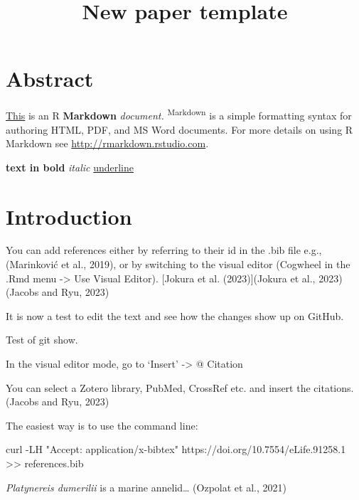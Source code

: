 \documentclass[
  11pt,
]{article}
\title{New paper template}
\subtitle{\raggedright

Author 1\textsuperscript{1,2,*} , Author 2\textsuperscript{1,2}, Author
3\textsuperscript{3}, Author 4E\textsuperscript{4}
\newline\textsuperscript{1}Heidelberg University, Centre for Organismal
Studies (COS), 69120 Heidelberg, Germany
\newline\textsuperscript{2}Affiliation 2
\newline\textsuperscript{3}Affiliation 3
\newline\textsuperscript{4}Affiliation 4\newline
\textsuperscript{*}Correspondence: xy@cos.uni-heidelberg.de}
\author{}
\date{}
\newenvironment{Shaded}{\begin{snugshade}}{\end{snugshade}}
\newcommand{\AttributeTok}[1]{\textcolor[rgb]{0.40,0.45,0.13}{#1}}
\newcommand{\ExtensionTok}[1]{\textcolor[rgb]{0.00,0.23,0.31}{#1}}
\newcommand{\NormalTok}[1]{\textcolor[rgb]{0.00,0.23,0.31}{#1}}
\newcommand{\OperatorTok}[1]{\textcolor[rgb]{0.37,0.37,0.37}{#1}}
\newcommand{\StringTok}[1]{\textcolor[rgb]{0.13,0.47,0.30}{#1}}
\renewcommand*\contentsname{Table of contents}
\newcommand\contentsname{Table of contents}
\begin{document}
\maketitle

\linenumbers

\renewcommand*\contentsname{Table of contents}
{
\hypersetup{linkcolor=}
\setcounter{tocdepth}{3}
\tableofcontents
}
\section{Abstract}\label{abstract}

\ul{This} is an R \textbf{Markdown} \emph{document.}
\textsuperscript{Markdown} is a simple formatting syntax for authoring
HTML, PDF, and MS Word documents. For more details on using R Markdown
see \url{http://rmarkdown.rstudio.com}.

\textbf{text in bold} \emph{italic} \ul{underline}

\section{Introduction}\label{introduction}

You can add references either by referring to their id in the .bib file
e.g., (Marinković et al., 2019), or by switching to the visual editor
(Cogwheel in the .Rmd menu -\textgreater{} Use Visual Editor). {[}Jokura
et al. (2023){]}(Jokura et al., 2023)(Jacobs and Ryu, 2023)

It is now a test to edit the text and see how the changes show up on
GitHub.

Test of git show.

In the visual editor mode, go to `Insert' -\textgreater{} @ Citation

You can select a Zotero library, PubMed, CrossRef etc. and insert the
citations. (Jacobs and Ryu, 2023)

The easiest way is to use the command line:

\begin{Shaded}
\begin{Highlighting}[]
\ExtensionTok{curl} \AttributeTok{{-}LH} \StringTok{"Accept: application/x{-}bibtex"}\NormalTok{ https://doi.org/10.7554/eLife.91258.1 }\OperatorTok{\textgreater{}\textgreater{}}\NormalTok{ references.bib}
\end{Highlighting}
\end{Shaded}

\emph{Platynereis dumerilii} is a marine annelid\ldots{} (Ozpolat et
al., 2021)
\end{document}
